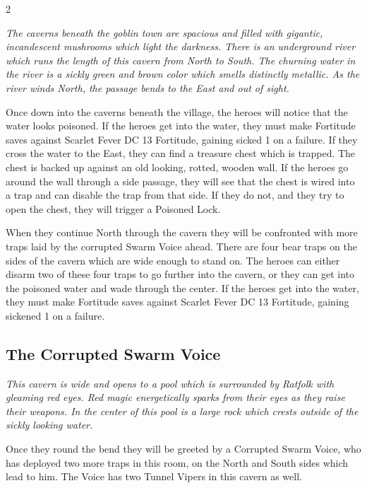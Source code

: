 \begin{multicols}{2}
  \begin{pf-parchment}[\textcolor{title1}{Description}]
    \textcolor{title1}{\textit{The caverns beneath the goblin town are spacious and filled with gigantic, incandescent mushrooms which light the darkness. There is an underground river which runs the length of this cavern from North to South. The churning water in the river is a sickly green and brown color which smells distinctly metallic. As the river winds North, the passage bends to the East and out of sight.}}
  \end{pf-parchment}

  Once down into the caverns beneath the village, the heroes will notice that the water looks poisoned. If the heroes get into the water, they must make Fortitude saves against Scarlet Fever DC 13 Fortitude, gaining sicked 1 on a failure. If they cross the water to the East, they can find a treasure chest which is trapped. The chest is backed up against an old looking, rotted, wooden wall. If the heroes go around the wall through a side passage, they will see that the chest is wired into a trap and can disable the trap from that side. If they do not, and they try to open the chest, they will trigger a Poisoned Lock.

  When they continue North through the cavern they will be confronted with more traps laid by the corrupted Swarm Voice ahead. There are four bear traps on the sides of the cavern which are wide enough to stand on. The heroes can either disarm two of these four traps to go further into the cavern, or they can get into the poisoned water and wade through the center. If the heroes get into the water, they must make Fortitude saves against Scarlet Fever DC 13 Fortitude, gaining sickened 1 on a failure.

  \subsection{The Corrupted Swarm Voice}

  \begin{pf-parchment}[\textcolor{title1}{Description}]
    \textcolor{title1}{\textit{This cavern is wide and opens to a pool which is surrounded by Ratfolk with gleaming red eyes. Red magic energetically sparks from their eyes as they raise their weapons. In the center of this pool is a large rock which crests outside of the sickly looking water.}}
  \end{pf-parchment}

  Once they round the bend they will be greeted by a Corrupted Swarm Voice, who has deployed two more traps in this room, on the North and South sides which lead to him. The Voice has two Tunnel Vipers in this cavern as well.


\end{multicols}
